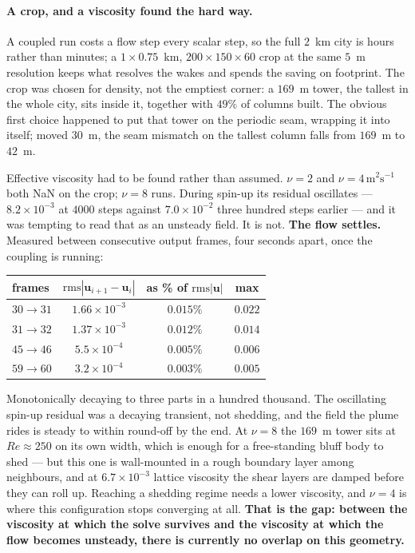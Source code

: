 \documentclass[11pt,a4paper]{article}
\newcommand{\uu}{\bm{u}}
\begin{document}
\paragraph{A crop, and a viscosity found the hard way.} A coupled run costs a
flow step every scalar step, so the full $2$~km city is hours rather than
minutes; a $1\times0.75$~km, $200\times150\times60$ crop at the same $5$~m
resolution keeps what resolves the wakes and spends the saving on footprint.
The crop was chosen for density, not the emptiest corner: a $169$~m tower, the
tallest in the whole city, sits inside it, together with $49\%$ of columns
built. The obvious first choice happened to put that tower on the periodic
seam, wrapping it into itself; moved $30$~m, the seam mismatch on the tallest
column falls from $169$~m to $42$~m.

Effective viscosity had to be found rather than assumed. $\nu=2$ and $\nu=4\,
\mathrm{m^2s^{-1}}$ both NaN on the crop; $\nu=8$ runs. During spin-up its
residual oscillates --- $8.2\times10^{-3}$ at $4000$ steps against
$7.0\times10^{-2}$ three hundred steps earlier --- and it was tempting to read
that as an unsteady field. It is not. \textbf{The flow settles.} Measured
between consecutive output frames, four seconds apart, once the coupling is
running:

\begin{center}\small
\begin{tabular}{lccc}
\toprule
frames & $\mathrm{rms}|\uu_{i+1}-\uu_i|$ & as \% of $\mathrm{rms}|\uu|$ & max \\
\midrule
$30\!\to\!31$ & $1.66\times10^{-3}$ & $0.015\%$ & $0.022$ \\
$31\!\to\!32$ & $1.37\times10^{-3}$ & $0.012\%$ & $0.014$ \\
$45\!\to\!46$ & $5.5\times10^{-4}$  & $0.005\%$ & $0.006$ \\
$59\!\to\!60$ & $3.2\times10^{-4}$  & $0.003\%$ & $0.005$ \\
\bottomrule
\end{tabular}
\end{center}

\noindent Monotonically decaying to three parts in a hundred thousand. The
oscillating spin-up residual was a decaying transient, not shedding, and the
field the plume rides is steady to within round-off by the end. At $\nu=8$ the
$169$~m tower sits at $Re\approx250$ on its own width, which is enough for a
free-standing bluff body to shed --- but this one is wall-mounted in a rough
boundary layer among neighbours, and at $6.7\times10^{-3}$ lattice viscosity the
shear layers are damped before they can roll up. Reaching a shedding regime
needs a lower viscosity, and $\nu=4$ is where this configuration stops
converging at all. \textbf{That is the gap: between the viscosity at which the
solve survives and the viscosity at which the flow becomes unsteady, there is
currently no overlap on this geometry.}
\end{document}
